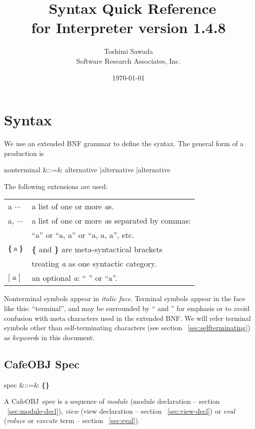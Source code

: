 \documentclass[a4paper]{article}
\title{\cafeobj\ Syntax Quick Reference \\
  {\small for Interpreter version 1.4.8}}
\date{\today}
\author{Toshimi Sawada \\
  Software Research Associates, Inc.}
\newenvironment{fminipage}%
{\begin{Sbox}\begin{minipage}}%
{\end{minipage}\end{Sbox}\fbox{\TheSbox}}
\def\cafeobj{\textsf{CafeOBJ}}
\def\sym#1{\textsf{#1}\null}
\def\nonterm#1{\textit{#1}\null}
\def\alt{{\;|\;}}
\def\seqof#1{\mbox{\textbf{\{}}\;{#1}\;\mbox{\textbf{\}}}}
\def\optn#1{\textbf{[}\;{#1}\;\textbf{]}}
\def\synindent{\;\;\;}
\begin{document}
\maketitle
\tableofcontents
%
\setlength{\parindent}{0pt}
\setlength{\parskip}{1.4ex}
\section{Syntax}
\label{sec:cafeobj-syntax}

We use an extended BNF grammar to define the syntax. The general form
of a production is
\begin{syntax}
\synindent\synindent  nonterminal &::=& alternative \alt alternative \alt \cdots \alt alternative
\end{syntax}

The following extensions are used:
\begin{center}
\begin{fminipage}{0.7\textwidth}
  \begin{tabular}{ll}
    a $\cdots$ & a list of one or more \textit{a}s. \\
    a, $\cdots$ & a list of one or more \textit{a}s separated by commas: \\
    & ``a'' or ``a, a'' or ``a, a, a'', etc. \\
    $\seqof{\textrm{a}}$ & \textbf{\{} and \textbf{\}} are meta-syntactical
    brackets \\ 
    & treating \textit{a} as one syntactic category. \\
    $\optn{\textrm{a}}$ & an optional \textit{a}: `` '' or ``a''.
  \end{tabular}
\end{fminipage}
\end{center}
Nonterminal symbols appear in \textit{italic face}. Terminal symbols
appear in the face like this: ``\sym{terminal}'', and may be
surrounded by `` and '' for emphasis or to avoid confusion
with meta characters used in the extended BNF. We will refer terminal
symbols other than self-terminating characters (see section
~\ref{sec:selfterminating}) as \textit{keyword}s in this document.

\subsection{CafeOBJ Spec}
\label{sec:cafeobjprogram}
\begin{syntax}
  \synindent\synindent spec &::=& \seqof{module \alt view \alt eval} \cdots
\end{syntax}
A \cafeobj\ spec is a sequence of \nonterm{module} (module declaration
-- section ~\ref{sec:module-decl}), \nonterm{view} (view declaration -- 
section ~\ref{sec:view-decl}) or \nonterm{eval} (\textit{reduce} or
\textit{execute} term -- section ~\ref{sec:eval}).
\end{document}
